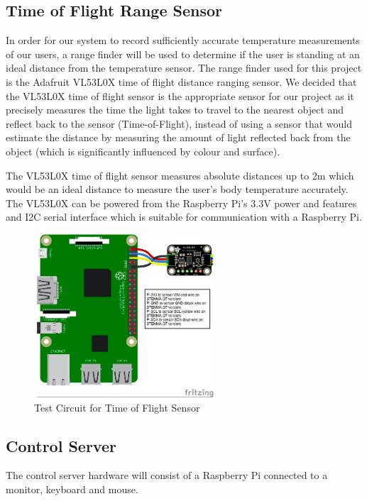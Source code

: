 \subsection{Time of Flight Range Sensor}

In order for our system to record sufficiently accurate temperature measurements 
of our users, a range finder will be used to determine if the user is standing 
at an ideal distance from the temperature sensor. The range finder used for this
project is the Adafruit VL53L0X time of flight distance ranging sensor. We
decided that the VL53L0X time of flight sensor is the appropriate sensor for our
project as it precisely measures the time the light takes to travel to the
nearest object and reflect back to the sensor (Time-of-Flight), instead of using
a sensor that would estimate the distance by measuring the amount of light
reflected back from the object (which is significantly influenced by colour and
surface).

The VL53L0X time of flight sensor measures absolute distances up to 2m which
would be an ideal distance to measure the user’s body temperature accurately.
The VL53L0X can be powered from the Raspberry Pi’s 3.3V power and features and
I2C serial interface which is suitable for communication with a Raspberry Pi.

\begin{figure}[!htb]
\centering
\includegraphics[width=0.6\textwidth]{images/tof-test-circuit.png}
\caption{Test Circuit for Time of Flight Sensor}
\label{fig:tof-test-circuit}
\end{figure}


\subsection{Control Server}

The control server hardware will consist of a Raspberry Pi connected to a
monitor, keyboard and mouse.

